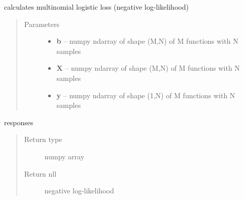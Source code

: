 \documentclass[letterpaper,10pt,english]{sphinxmanual}
\begin{document}
\begin{fulllineitems}
\label{regression:regression.mlogit_loss}
calculates multinomial logistic loss (negative log-likelihood)
\begin{quote}\begin{description}
\item[{Parameters}] \leavevmode\begin{itemize}
\item {} 
\textbf{b} -- numpy ndarray of shape (M,N) of M functions with N samples

\item {} 
\textbf{X} -- numpy ndarray of shape (M,N) of M functions with N samples

\item {} 
\textbf{y} -- numpy ndarray of shape (1,N) of M functions with N samples

\end{itemize}

\end{description}\end{quote}

responses
\begin{quote}\begin{description}
\item[{Return type}] \leavevmode
numpy array

\item[{Return nll}] \leavevmode
negative log-likelihood

\end{description}\end{quote}

\end{fulllineitems}

\end{document}
